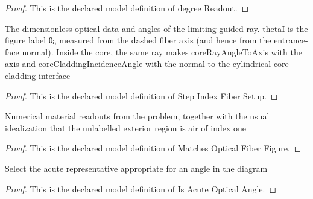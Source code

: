 \begin{proof}
  This is the declared model definition of degree Readout.
\end{proof}
\begin{definition}
  \label{def:physics:phyx-mini-0098:phyxminiproblems-problemphyxmini0098-stepindexfibersetup}
  The dimensionless optical data and angles of the limiting guided ray. thetaI is the figure label θᵢ, measured from the dashed fiber axis (and hence from the entrance-face normal). Inside the core, the same ray makes coreRayAngleToAxis with the axis and coreCladdingIncidenceAngle with the normal to the cylindrical core--cladding interface
\end{definition}
\begin{proof}
  This is the declared model definition of Step Index Fiber Setup.
\end{proof}
\begin{definition}
  \label{def:physics:phyx-mini-0098:phyxminiproblems-problemphyxmini0098-matchesopticalfiberfigure}
  Numerical material readouts from the problem, together with the usual idealization that the unlabelled exterior region is air of index one
\end{definition}
\begin{proof}
  This is the declared model definition of Matches Optical Fiber Figure.
\end{proof}
\begin{definition}
  \label{def:physics:phyx-mini-0098:phyxminiproblems-problemphyxmini0098-isacuteopticalangle}
  Select the acute representative appropriate for an angle in the diagram
\end{definition}
\begin{proof}
  This is the declared model definition of Is Acute Optical Angle.
\end{proof}
